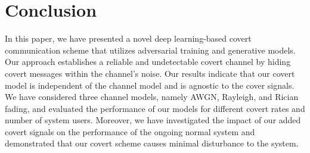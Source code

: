 \section{Conclusion}
\label{s:conc}
In this paper, we have presented a novel deep learning-based covert communication scheme that utilizes adversarial training and generative models. Our approach establishes a reliable and undetectable covert channel by hiding covert messages within the channel's noise. Our results indicate that our covert model is independent of the channel model and is agnostic to the cover signals. We have considered three channel models, namely AWGN, Rayleigh, and Rician fading, and evaluated the performance of our models for different covert rates and number of system users. Moreover, we have investigated the impact of our added covert signals on the performance of the ongoing normal system and demonstrated that our covert scheme causes minimal disturbance to the system.